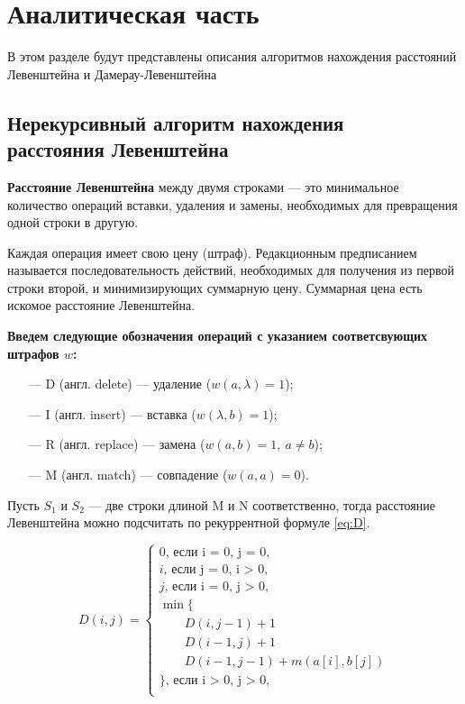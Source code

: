 \chapter{Аналитическая часть}
В этом разделе будут представлены описания алгоритмов нахождения расстояний Левенштейна и Дамерау-Левенштейна

\section{Нерекурсивный алгоритм нахождения \\расстояния Левенштейна}

\textbf{Расстояние Левенштейна } между двумя строками --- это минимальное количество операций вставки, удаления и замены, необходимых для превращения одной строки в другую.

Каждая операция имеет свою цену (штраф). Редакционным предписанием называется последовательность действий, необходимых для получения из первой строки второй, и минимизирующих суммарную цену. Суммарная цена есть искомое расстояние Левенштейна.

\bigskip

\textbf{Введем следующие обозначения операций с указанием соответсвующих штрафов $w$:} 
\begin{itemize}
	\item[---] D (англ. delete) --- удаление ($w(a,\lambda)=1$);
	\item[---] I (англ. insert) --- вставка ($w(\lambda,b)=1$);
	\item[---] R (англ. replace) --- замена  ($w(a,b)=1, \medspace a \neq b$);
	\item[---] M (англ. match) --- совпадение ($w(a,a)=0$).
\end{itemize}

Пусть $S_{1}$ и $S_{2}$ --- две строки длиной M и N соответственно, тогда расстояние Левенштейна можно подсчитать по рекуррентной формуле \ref{eq:D}.

\begin{equation}
	\label{eq:D}
	D(i, j) = \begin{cases}
		
		0 \text{, если i = 0, j = 0,}\\
		i \text{, если j = 0, i > 0,}\\
		j \text{, если i = 0, j > 0,}\\
		\min \lbrace \\
		\qquad D(i, j-1) + 1\\
		\qquad D(i-1, j) + 1\\
		\qquad D(i-1, j-1) + m(a[i], b[j]) \\
		\rbrace \text{, если i > 0, j > 0,}\\
	\end{cases}
\end{equation}

